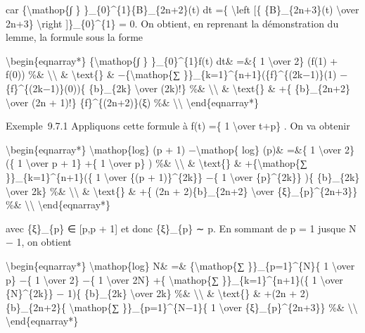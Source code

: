 \documentclass[]{article}
\begin{document}
car \{\textbackslash{}mathop\{∫ \} \}\_\{0\}\^{}\{1\}\{B\}\_\{2n+2\}(t)
dt =\{ \textbackslash{}left {[}\{ \{B\}\_\{2n+3\}(t)
\textbackslash{}over 2n+3\} \textbackslash{}right {]}\}\_\{0\}\^{}\{1\}
= 0. On obtient, en reprenant la démonstration du lemme, la formule sous
la forme

\textbackslash{}begin\{eqnarray*\} \{\textbackslash{}mathop\{∫ \}
\}\_\{0\}\^{}\{1\}f(t) dt\& =\&\{ 1 \textbackslash{}over 2\} (f(1) +
f(0)) \%\& \textbackslash{}\textbackslash{} \& \textbackslash{}text\{\}
\& −\{\textbackslash{}mathop\{∑
\}\}\_\{k=1\}\^{}\{n+1\}(\{f\}\^{}\{(2k−1)\}(1) −
\{f\}\^{}\{(2k−1)\}(0))\{ \{b\}\_\{2k\} \textbackslash{}over (2k)!\}
\%\& \textbackslash{}\textbackslash{} \& \textbackslash{}text\{\} \& +\{
\{b\}\_\{2n+2\} \textbackslash{}over (2n + 1)!\} \{f\}\^{}\{(2n+2)\}(ξ)
\%\& \textbackslash{}\textbackslash{} \textbackslash{}end\{eqnarray*\}

Exemple~9.7.1 Appliquons cette formule à f(t) =\{ 1 \textbackslash{}over
t+p\} . On va obtenir

\textbackslash{}begin\{eqnarray*\} \textbackslash{}mathop\{log\} (p + 1)
−\textbackslash{}mathop\{ log\} (p)\& =\&\{ 1 \textbackslash{}over 2\}
(\{ 1 \textbackslash{}over p + 1\} +\{ 1 \textbackslash{}over p\} ) \%\&
\textbackslash{}\textbackslash{} \& \textbackslash{}text\{\} \&
+\{\textbackslash{}mathop\{∑ \}\}\_\{k=1\}\^{}\{n+1\}(\{ 1
\textbackslash{}over \{(p + 1)\}\^{}\{2k\}\} −\{ 1 \textbackslash{}over
\{p\}\^{}\{2k\}\} )\{ \{b\}\_\{2k\} \textbackslash{}over 2k\} \%\&
\textbackslash{}\textbackslash{} \& \textbackslash{}text\{\} \& +\{ (2n
+ 2)\{b\}\_\{2n+2\} \textbackslash{}over \{ξ\}\_\{p\}\^{}\{2n+3\}\} \%\&
\textbackslash{}\textbackslash{} \textbackslash{}end\{eqnarray*\}

avec \{ξ\}\_\{p\} ∈ {[}p,p + 1{]} et donc \{ξ\}\_\{p\} ∼ p. En sommant
de p = 1 jusque N − 1, on obtient

\textbackslash{}begin\{eqnarray*\} \textbackslash{}mathop\{log\} N\& =\&
\{\textbackslash{}mathop\{∑ \}\}\_\{p=1\}\^{}\{N\}\{ 1
\textbackslash{}over p\} −\{ 1 \textbackslash{}over 2\} −\{ 1
\textbackslash{}over 2N\} +\{ \textbackslash{}mathop\{∑
\}\}\_\{k=1\}\^{}\{n+1\}(\{ 1 \textbackslash{}over \{N\}\^{}\{2k\}\} −
1)\{ \{b\}\_\{2k\} \textbackslash{}over 2k\} \%\&
\textbackslash{}\textbackslash{} \& \textbackslash{}text\{\} \& +(2n +
2)\{b\}\_\{2n+2\}\{ \textbackslash{}mathop\{∑ \}\}\_\{p=1\}\^{}\{N−1\}\{
1 \textbackslash{}over \{ξ\}\_\{p\}\^{}\{2n+3\}\} \%\&
\textbackslash{}\textbackslash{} \textbackslash{}end\{eqnarray*\}
\end{document}
